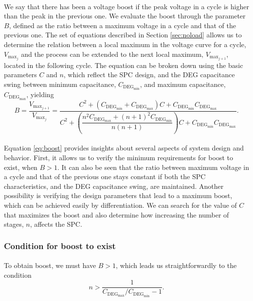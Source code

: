 \paragraph{} We say that there has been a voltage boost if the peak voltage in a cycle is higher than the peak in the previous one. We evaluate the boost through the parameter $B$, defined as the ratio between a maximum voltage in a cycle and that of the previous one. The set of equations described in Section \ref{sec:noload} allows us to determine the relation between a local maximum in the voltage curve for a cycle, $V_{\text{max}_{j}}$ and the process can be extended to the next local maximum, $V_{\text{max}_{j+1}}$, located in the following cycle. The equation can be broken down using the basic parameters $C$ and $n$, which reflect the SPC design, and the DEG capacitance swing between minimum capacitance, $C_{\text{DEG}_\text{min}}$, and maximum capacitance, $C_{\text{DEG}_\text{max}}$, yielding
\begin{equation}\label{eq:boost}
B = \frac{V_{\text{max}_{j+1}}}{V_{\text{max}_{j}}}=\frac{C^{2}+(C_{\text{DEG}_{\min}}+C_{\text{DEG}_{\max}})C+C_{\text{DEG}_{\min}}C_{\text{DEG}_{\max}}}{C^{2}+\left(\dfrac{n^{2}C_{\text{DEG}_{\max}}+(n+1)^{2}C_{\text{DEG}_{\min}}}{n(n+1)}\right)C+C_{\text{DEG}_{\min}}C_{\text{DEG}_{\max}}}.
\end{equation}

\paragraph{} Equation \ref{eq:boost} provides insights about several aspects of system design and behavior. First, it allows us to verify the minimum requirements for boost to exist, when $B >1$. It can also be seen that the ratio between maximum voltage in a cycle and that of the previous one stays constant if both the SPC  characteristics, and the DEG capacitance swing, are maintained. Another possibility is verifying the design parameters that lead to a maximum boost, which can be achieved easily by differentiation. We can search for the value of $C$ that maximizes the boost and also determine how increasing the number of stages, $n$, affects the SPC.


\subsubsection{Condition for boost to exist}
\paragraph{} To obtain boost, we must have $B>1$, which leads us straightforwardly to the condition
\begin{equation}\label{eq:ncond}
n > \frac{1}{C_{\text{DEG}_\text{max}}/C_{\text{DEG}_\text{min}}-1}.
\end{equation}

